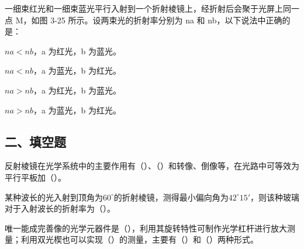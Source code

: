 \documentclass[padl, analysis, notocnum]{ExBook}
\newcommand{\answerarea}[1][3.5cm]{%
  \par\vspace{1mm}%
  \noindent{\color{themeColor!35}\rule{\linewidth}{0.4pt}}\par
  \noindent\begin{minipage}[t][#1][t]{\linewidth}\vspace{0pt}\end{minipage}\par
  \noindent{\color{themeColor!35}\rule{\linewidth}{0.4pt}}\par
}
\begin{document}
\begin{qitems}[startnum=4]
\qitem 一细束红光和一细束蓝光平行入射到一个折射棱镜上，经折射后会聚于光屏上同一点 M，如图 3-25 所示。设两束光的折射率分别为 na 和 nb，以下说法中正确的是：
\par\noindent\hspace{2em}$na<nb$，a 为红光，b 为蓝光。
\par\noindent\hspace{2em}$na<nb$，a 为蓝光，b 为红光。
\par\noindent\hspace{2em}$na>nb$，a 为红光，b 为蓝光。
\par\noindent\hspace{2em}$na>nb$，a 为蓝光，b 为红光。
\label{q:54:start}
\answerarea[1.6cm]
\label{q:54:end}
\end{qitems}

\subsection{二、填空题}
\begin{qitems}[startnum=1]
\qitem 反射棱镜在光学系统中的主要作用有（\hspace{1.6em}）、（\hspace{1.6em}）和转像、倒像等，在光路中可等效为平行平板加（\hspace{1.6em}）。
\label{q:55:start}
\answerarea[4.0cm]
\label{q:55:end}
\end{qitems}

\begin{qitems}[startnum=2]
\qitem 某种波长的光入射到顶角为$60^{\circ}$的折射棱镜，测得最小偏向角为$42^{\circ}15'$，则该种玻璃对于入射波长的折射率为（\hspace{1.6em}）。
\label{q:56:start}
\answerarea[4.0cm]
\label{q:56:end}
\end{qitems}

\begin{qitems}[startnum=3]
\qitem 唯一能成完善像的光学元器件是（\hspace{1.6em}），利用其旋转特性可制作光学杠杆进行放大测量；利用双光楔也可以实现（\hspace{1.6em}）的测量，主要有（\hspace{1.6em}）和（\hspace{1.6em}）两种形式。
\label{q:57:start}
\answerarea[4.0cm]
\label{q:57:end}
\end{qitems}
\end{document}

